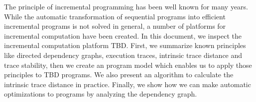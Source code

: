 The principle of incremental programming has been well known for many years. While the automatic transformation of sequential programs into efficient incremental programs is not solved in general, a number of platforms for incremental computation have been created. In this document, we inspect the incremental computation platform TBD. First, we summarize known principles like directed dependency graphs, execution traces, intrinsic trace distance and trace stability, then we create an program model which enables us to apply those principles to TBD programs. We also present an algorithm to calculate the intrinsic trace distance in practice. Finally, we show how we can make automatic optimizations to programs by analyzing the dependency graph. 
